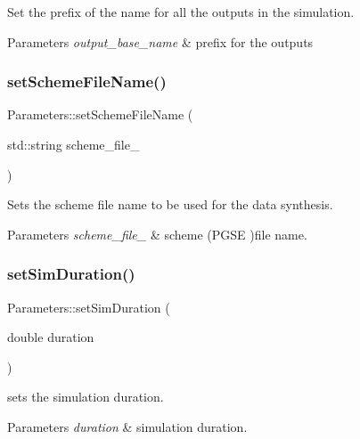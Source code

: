 Set the prefix of the name for all the outputs in the simulation. 


\begin{DoxyParams}{Parameters}
{\em output\+\_\+base\+\_\+name} & prefix for the outputs \\
\hline
\end{DoxyParams}
\mbox{\label{class_parameters_a95ca6c28a5c87363460ca48eed5f065f}} 
\subsubsection{\texorpdfstring{set\+Scheme\+File\+Name()}{setSchemeFileName()}}
{\footnotesize\ttfamily Parameters\+::set\+Scheme\+File\+Name (\begin{DoxyParamCaption}\item[{std\+::string}]{scheme\+\_\+file\+\_\+ }\end{DoxyParamCaption})}



Sets the scheme file name to be used for the data synthesis. 


\begin{DoxyParams}{Parameters}
{\em scheme\+\_\+file\+\_\+} & scheme (P\+G\+SE )file name. \\
\hline
\end{DoxyParams}
\mbox{\label{class_parameters_a934a87940878dc78b75ae4c230132f75}} 
\subsubsection{\texorpdfstring{set\+Sim\+Duration()}{setSimDuration()}}
{\footnotesize\ttfamily Parameters\+::set\+Sim\+Duration (\begin{DoxyParamCaption}\item[{double}]{duration }\end{DoxyParamCaption})}



sets the simulation duration. 


\begin{DoxyParams}{Parameters}
{\em duration} & simulation duration. \\
\hline
\end{DoxyParams}
\mbox{\label{class_parameters_ac07671c27ff8f0ec9f5d8bdc656e7ffb}} 
